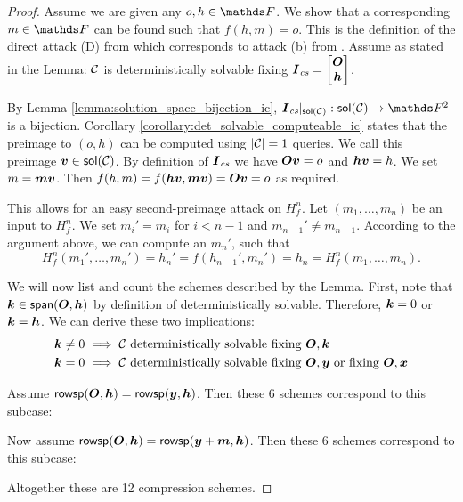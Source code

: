 \begin{proof}
    Assume we are given any $o, h \in \F$.
    We show that a corresponding $m \in \F$ can be found such that $f(h,m) = o$.
    This is the definition of the direct attack (D) from \cite{C:PreGovVan93} which corresponds to attack (b) from \cite{C:BlaRogShr02}.
    Assume as stated in the Lemma: $\mathcal{C}$ is deterministically solvable fixing $\Ics = \m{\O \\ \vh}$.

    By Lemma \ref{lemma:solution_space_bijection_ic}, $\Ics|_{\sol(\C)} : \sol(\C) \to \F^2$ is a bijection.
    Corollary \ref{corollary:det_solvable_computeable_ic} states that the preimage to $(o,h)$ can be computed using $|\mathcal{C}| = 1$ queries.
    We call this preimage $\boldsymbol v \in \mathsf{sol}(\mathcal{C})$.
    By definition of $\boldsymbol{I}_\textit{cs}$ we have $\boldsymbol{O}\boldsymbol v = o$ and $\boldsymbol h\boldsymbol v = h$.
    We set $m = \boldsymbol m \boldsymbol v$.
    Then $f(h,m) = f(\boldsymbol h\boldsymbol v, \boldsymbol m\boldsymbol v) = \boldsymbol{O}\boldsymbol v = o$ as required.
    
    This allows for an easy second-preimage attack on $H^n_f$.
    Let $(m_1, \dots, m_n)$ be an input to $H^n_f$.
    We set $m_i' = m_i$ for $i<n-1$ and $m_{n-1}' \neq m_{n-1}$.
    According to the argument above, we can compute an $m_n'$, such that
    \[
    H^n_f(m_1', \dots, m_n') = h_n' = f(h_{n-1}', m_n') = h_n = H^n_f(m_1, \dots, m_n).
    \]

We will now list and count the schemes described by the Lemma.
First, note that $\boldsymbol k \in \mathsf{span}(\boldsymbol{O}, \boldsymbol h)$ by definition of deterministically solvable.
Therefore, $\boldsymbol k = 0$ or $\boldsymbol k = \boldsymbol h$.
We can derive these two implications:
\begin{align}
\boldsymbol k \neq 0 &\implies \mathcal{C} \textrm{ deterministically solvable fixing } \boldsymbol{O}, \boldsymbol k \\
\boldsymbol k = 0    &\implies \mathcal{C} \textrm{ deterministically solvable fixing } \boldsymbol{O}, \boldsymbol y \textrm{ or fixing } \boldsymbol{O}, \boldsymbol x
\end{align}

Assume $\mathsf{rowsp}(\boldsymbol{O}, \boldsymbol h) = \mathsf{rowsp}(\boldsymbol y, \boldsymbol h)$.
Then these 6 schemes correspond to this subcase:

\begin{center}
\end{center}
Now assume $\mathsf{rowsp}(\boldsymbol{O}, \boldsymbol h) = \mathsf{rowsp}(\boldsymbol y + \boldsymbol m, \boldsymbol h)$.
Then these 6 schemes correspond to this subcase:

\begin{center}
\end{center}
Altogether these are 12 compression schemes.
\end{proof}



